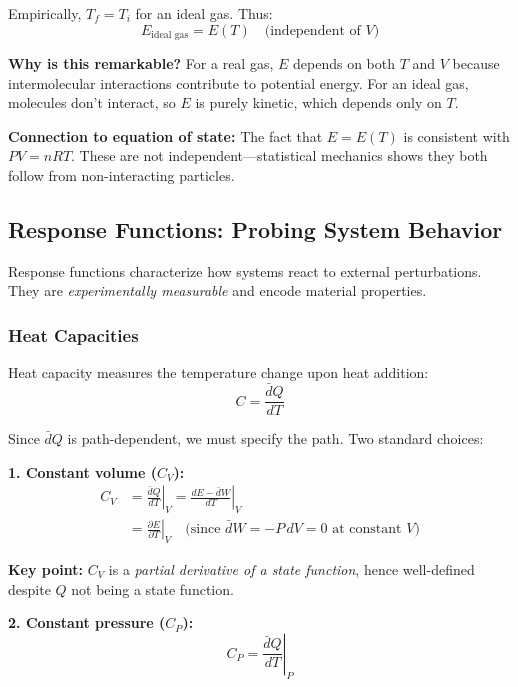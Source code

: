 \documentclass[9pt,twocoloumn]{article}
\begin{document}
Empirically, $T_f = T_i$ for an ideal gas. Thus:
\begin{equation}
\boxed{E_{\text{ideal gas}} = E(T) \quad \text{(independent of } V \text{)}}
\end{equation}

\textbf{Why is this remarkable?} For a real gas, $E$ depends on both $T$ and $V$ because intermolecular interactions contribute to potential energy. For an ideal gas, molecules don't interact, so $E$ is purely kinetic, which depends only on $T$.

\textbf{Connection to equation of state:} The fact that $E = E(T)$ is consistent with $PV = nRT$. These are not independent—statistical mechanics shows they both follow from non-interacting particles.

\subsection{Response Functions: Probing System Behavior}
Response functions characterize how systems react to external perturbations. They are \emph{experimentally measurable} and encode material properties.

\subsubsection{Heat Capacities}
Heat capacity measures the temperature change upon heat addition:
\begin{equation}
C = \frac{\bar{d}Q}{dT}
\end{equation}

Since $\bar{d}Q$ is path-dependent, we must specify the path. Two standard choices:

\textbf{1. Constant volume ($C_V$):}
\begin{align}
C_V &= \left. \frac{\bar{d}Q}{dT} \right|_V = \left. \frac{dE - \bar{d}W}{dT} \right|_V \\
&= \left. \frac{\partial E}{\partial T} \right|_V \quad \text{(since } \bar{d}W = -P \, dV = 0 \text{ at constant } V \text{)}
\end{align}

\textbf{Key point:} $C_V$ is a \emph{partial derivative of a state function}, hence well-defined despite $Q$ not being a state function.

\textbf{2. Constant pressure ($C_P$):}
\begin{equation}
C_P = \left. \frac{\bar{d}Q}{dT} \right|_P
\end{equation}
\end{document}
